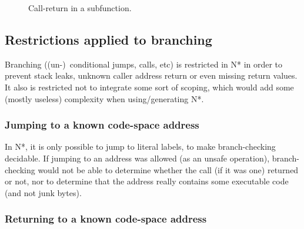 \begin{figure}[htb]
  \centering


  \caption{Call-return in a subfunction.}
  \label{fig:nstar-common-bs-funcall-subcallreturn}
\end{figure}

\subsection{Restrictions applied to branching}\label{subsec:nstar-common-bs-restrictions}

Branching ((un-)\ conditional jumps, calls, etc) is restricted in N* in order to prevent stack leaks, unknown caller address return or even missing return values.
It also is restricted not to integrate some sort of scoping, which would add some (mostly useless) complexity when using/generating N*.

\subsubsection{Jumping to a known code-space address}\label{subsubsec:nstar-common-bs-restrictions-calljmp}

In N*, it is only possible to jump to literal labels, to make branch-checking decidable.
If jumping to an address was allowed (as an unsafe operation), branch-checking would not be able to determine whether the call (if it was one) returned or not, nor to determine that the address really contains some executable code (and not junk bytes).

\subsubsection{Returning to a known code-space address}\label{subsubsec:nstar-common-bs-restrictions-ret}


